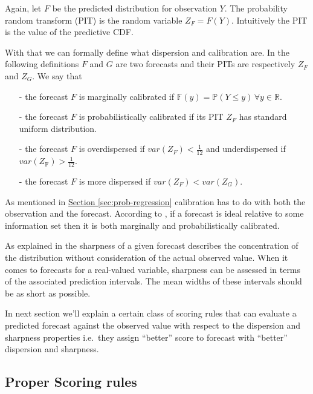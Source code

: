 \documentclass[12pt,a4paper,twoside]{scrartcl}
\numberwithin{equation}{section}
\newcommand{\refsec}[1]{\hyperref[#1]{Section \ref*{#1}}}
\begin{document}
Again, let \(F\) be the predicted distribution for observation \(Y\). The probability random transform (PIT) is the random variable \(Z_F=F(Y)\). Intuitively the PIT is the value of the predictive CDF.

With that we can formally define what dispersion and calibration are. In the following definitions \(F\) and \(G\) are two forecasts and their PITs are respectively \(Z_F\) and \(Z_G\). We say that
\begin{itemize}
\item[-] the forecast \(F\) is marginally calibrated if \(\mathbb{F}(y) = \mathbb{P}(Y \leq y)\, \forall y\in\mathbb{R}\).
\item[-] the forecast \(F\) is probabilistically calibrated if its PIT \(Z_F\) has standard uniform distribution.
\item[-] the forecast \(F\) is overdispersed if \(var(Z_F) < \frac{1}{12}\) and underdispersed if \(var(Z_{\text{F}}) > \frac{1}{12} \).
\item[-] the forecast \(F\) is more dispersed if \(var(Z_F) < var(Z_G)\).
\end{itemize}

As mentioned in \refsec{sec:prob-regression}  calibration has to do with both the observation and the forecast. According to \cite{gneiting2014}, if a forecast is ideal relative to some information set then it is both marginally and probabilistically calibrated.

As explained in \cite{gneiting2014} the sharpness of a given forecast describes the concentration of the distribution without consideration of the actual observed value. When it comes to forecasts for a real-valued variable, sharpness can be assessed in terms of the associated prediction intervals. The mean widths of these intervals should be as short as possible. 

In next section we'll explain a certain class of scoring rules that can evaluate a predicted forecast against the observed value with respect to the dispersion and sharpness properties i.e.\ they assign ``better'' score to forecast with ``better'' dispersion and sharpness.
\subsection{Proper Scoring rules}\label{sec:proper-scoring-rules}
\end{document}
